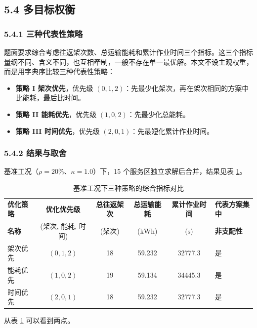 \documentclass[withoutpreface,bwprint]{format}
\begin{document}
\subsection{5.4 多目标权衡}

\subsubsection{5.4.1 三种代表性策略}
题面要求综合考虑往返架次数、总运输能耗和累计作业时间三个指标。这三个指标量纲不同、含义不同，也互相牵制，一般不存在单一最优解。本文不设主观权重，而是用字典序比较三种代表性策略\cite{ehrgott2005, marler2004}：

\begin{itemize}[leftmargin=*]
    \item \textbf{策略 I 架次优先}，优先级 $(0,1,2)$：先最少化架次，再在架次相同的方案中比能耗，最后比时间。
    \item \textbf{策略 II 能耗优先}，优先级 $(1,0,2)$：先最少化总能耗。
    \item \textbf{策略 III 时间优先}，优先级 $(2,0,1)$：先最短化累计作业时间。
\end{itemize}

\subsubsection{5.4.2 结果与取舍}
基准工况（$\rho=20\%$、$\kappa=1.0$）下，15 个服务区独立求解后合并，结果见表 \ref{tab:tradeoff}。

\begin{table}[H]
\centering
\caption{基准工况下三种策略的综合指标对比}
\label{tab:tradeoff}
\begin{tabularx}{\textwidth}{l c c c c >{\centering\arraybackslash}X}
\toprule
\textbf{优化策略} & \textbf{优化优先级} & \textbf{总往返架次} & \textbf{总运输能耗} & \textbf{累计作业时间} & \textbf{代表方案集中} \\
\textbf{名称} & (架次, 能耗, 时间) & (架次) & ($\text{kWh}$) & ($\text{s}$) & \textbf{非支配性} \\
\midrule
架次优先 & $(0, 1, 2)$ & 18 & 59.232 & 32777.3 & 是 \\
能耗优先 & $(1, 0, 2)$ & 19 & 59.134 & 34445.3 & 是 \\
时间优先 & $(2, 0, 1)$ & 18 & 59.232 & 32777.3 & 是 \\
\bottomrule
\end{tabularx}
\end{table}

从表 \ref{tab:tradeoff} 可以看到两点。
\end{document}
